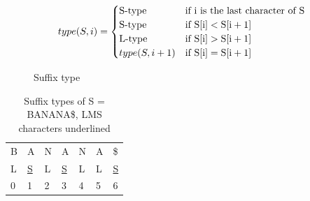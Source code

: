 \begin{figure}[t]
    \begin{center}
	$$
        type(S, i) =
        \begin{cases}
            \text{S-type} & \textrm{if\ i\ is\ the\ last\ character\ of\ S} \\
            \text{S-type} & \textrm{if\ } \ArrayAccess{\Var{S}}{\Var{i}} < \ArrayAccess{\Var{S}}{\Var{i + 1}} \\
            \text{L-type} & \textrm{if\ } \ArrayAccess{\Var{S}}{\Var{i}} > \ArrayAccess{\Var{S}}{\Var{i + 1}} \\
            type(S, i + 1) & \textrm{if\ } \ArrayAccess{\Var{S}}{\Var{i}} = \ArrayAccess{\Var{S}}{\Var{i + 1}} 
        \end{cases}
	$$

	\caption{Suffix type}
	\label{eq:suffixtypesrecurrence}
    \end{center}
\end{figure}

\begin{table}[t]
    \begin{center}
        \begin{tabular}[c]{l l l l l l l}
            B & A & N & A & N & A & \$ \\ 
            L & \underline{S} & L & \underline{S} & L & L & \underline{S} \\ 
            0 & 1 & 2 & 3 & 4 & 5 & 6 \\ 
        \end{tabular}
    \end{center}
    \caption{Suffix types of S = BANANA\$, LMS characters underlined}
    \label{tab:suffixtypesbanana}
\end{table}


